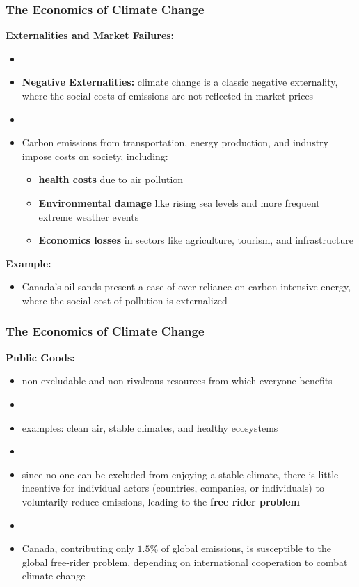\documentclass[blue]{beamer}
\begin{document}
 
 
 
      \begin{frame} \frametitle{The Economics of Climate Change}
\label{The Economics of Climate Change}
\textbf{Externalities and Market Failures:}
\begin{itemize}
\item[]
\item \textbf{Negative Externalities:} climate change is a classic negative externality, where the social costs of emissions are not reflected in market prices
\item[]
\item Carbon emissions from transportation, energy production, and industry impose costs on society, including:

\begin{itemize}

\item \textbf{health costs} due to air pollution
\item \textbf{Environmental damage} like rising sea levels and more frequent extreme weather events
\item \textbf{Economics losses} in sectors like agriculture, tourism, and infrastructure
\end{itemize}

\end{itemize}
\textbf{Example:}
\begin{itemize}
\item Canada's oil sands present a case of over-reliance on carbon-intensive energy, where the social cost of pollution is externalized

\end{itemize}
 \end{frame}
 
 
 
       \begin{frame} \frametitle{The Economics of Climate Change}
\label{The Economics of Climate Change}
\textbf{Public Goods:}
\begin{itemize}

\item non-excludable and non-rivalrous resources from which everyone benefits
\item[]
\item examples: clean air, stable climates, and healthy ecosystems
\item[]
\item since no one can be excluded from enjoying a stable climate, there is little incentive for individual actors (countries, companies, or individuals) to voluntarily reduce emissions, leading to the \textbf{free rider problem}
\item[]
\item Canada,  contributing only $1.5\%$ of global emissions, is susceptible to the global free-rider problem, depending on international cooperation to combat climate change

\end{itemize}
 \end{frame}
 
\end{document}
